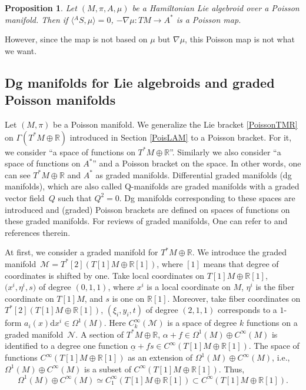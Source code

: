 \documentclass[10pt,a4paper]{amsart}
\numberwithin{equation}{section}
\newtheorem{Proposition}[Theorem]{Proposition}
 { \theoremstyle{definition}
\newtheorem{Definition}[Theorem]{Definition}
\newtheorem{Note}[Theorem]{Note}
\newtheorem{Example}[Theorem]{Example}
\newtheorem{Remark}[Theorem]{Remark}
\newtheorem{Question}[Theorem]{Question}
 }
\def\bR{{\mathbb{R}}}
\newcommand{\calM}{{\mathcal M}}
\newcommand{\calN}{{\mathcal N}}
\newcommand{\rd}{\mathrm{d}}
\newcommand{\ualpha}{{\underline{\alpha}}{}}
\begin{document}
\begin{Proposition}\label{nablamuPoisson}
Let $(M, \pi, A, \mu)$ be a Hamiltonian Lie algebroid over a Poisson manifold.
Then if $\bigl\langle{}^A S,\mu\bigr\rangle =0$,
$-\nabla \mu\colon TM \rightarrow A^*$ is a Poisson map.
\end{Proposition}
However, since the map is not based on $\mu$ but $\nabla \mu$,
this Poisson map is not what we want.


\subsection{Dg manifolds for Lie algebroids and graded Poisson manifolds}

Let $(M, \pi)$ be a Poisson manifold.
We generalize the Lie bracket \eqref{PoissonTMR} on
$\Gamma(T^*M \oplus \bR)$ introduced in Section \ref{PoisLAM}
to a Poisson bracket.
For it, we consider ``a space of functions on $T^*M \oplus \bR$''.
Similarly we also consider ``a space of functions on $A^*$''
and a Poisson bracket on the space.
In other words, one can see $T^*M \oplus \bR$ and $A^*$
as graded manifolds.
Differential graded manifolds (dg manifolds), which are also called Q-manifolds
are graded manifolds with a graded vector field~$Q$ such that $Q^2=0$.
Dg manifolds corresponding to these spaces are introduced and (graded) Poisson brackets are defined on spaces of functions on these graded manifolds.
For reviews of graded manifolds, One can refer to \cite{Cattaneo:2010re, Ikeda:2012pv,
Roytenberg:2006qz} and references therein.

At first, we consider a graded manifold for $T^*M \oplus \bR$.
We introduce the graded manifold~${\calM = T^*[2](T[1]M \oplus \bR[1])}$,
where $[1]$ means that degree of coordinates is shifted by one.
Take local coordinates on $T[1]M \oplus \bR[1]$,
$\bigl(x^i, \eta^i, s\bigr)$ of degree $(0, 1, 1)$, where
$x^i$ is a local coordinate on $M$,
$\eta^i$ is the fiber coordinate on $T[1]M$,
and $s$ is one on $\bR[1]$.
Moreover, take fiber coordinates on
$T^*[2](T[1]M \oplus \bR[1])$, $(\xi_i, y_i, t)$ of degree
$(2, 1, 1)$
corresponds to a $1$-form $a_i(x) \rd x^i \in \Omega^1(M)$.
Here $C_k^{\infty}(\calM)$ is a space of degree $k$ functions on a graded
manifold~$\calN$.
A section of $T^*M \oplus \bR$,
$\alpha + f \in \Omega^1(M) \oplus C^{\infty}(M)$ is identified to
a degree one function
$\ualpha + f s \in C^{\infty}(T[1]M \oplus \bR[1])$.
The space of functions $C^{\infty}(T[1]M \oplus \bR[1])$ as an extension of
$\Omega^1(M) \oplus C^{\infty}(M)$, i.e.,
$\Omega^1(M) \oplus C^{\infty}(M)$ is a subset of
$C^{\infty}(T[1]M \oplus \bR[1])$.
Thus, \[\Omega^1(M) \oplus C^{\infty}(M) \simeq
C_1^{\infty}(T[1]M \oplus \bR[1]) \subset C^{\infty}(T[1]M \oplus \bR[1]).\]
\end{document}
